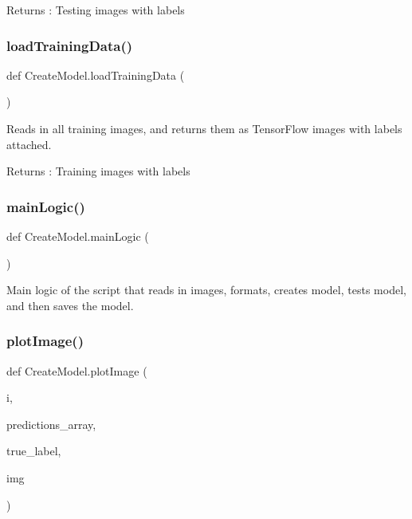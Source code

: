 \begin{DoxyReturn}{Returns}
\+: Testing images with labels 
\end{DoxyReturn}
\mbox{\label{namespaceCreateModel_a13d98b7ab2f39bdfb831e2f87a299c7e}} 
\subsubsection{\texorpdfstring{load\+Training\+Data()}{loadTrainingData()}}
{\footnotesize\ttfamily def Create\+Model.\+load\+Training\+Data (\begin{DoxyParamCaption}{ }\end{DoxyParamCaption})}



Reads in all training images, and returns them as Tensor\+Flow images with labels attached. 

\begin{DoxyReturn}{Returns}
\+: Training images with labels 
\end{DoxyReturn}
\mbox{\label{namespaceCreateModel_a34139424c0de1bb7aaf8f04b931ba11f}} 
\subsubsection{\texorpdfstring{main\+Logic()}{mainLogic()}}
{\footnotesize\ttfamily def Create\+Model.\+main\+Logic (\begin{DoxyParamCaption}{ }\end{DoxyParamCaption})}



Main logic of the script that reads in images, formats, creates model, tests model, and then saves the model. 

\mbox{\label{namespaceCreateModel_a596ac84e0b693e1daeb598454dc87f74}} 
\subsubsection{\texorpdfstring{plot\+Image()}{plotImage()}}
{\footnotesize\ttfamily def Create\+Model.\+plot\+Image (\begin{DoxyParamCaption}\item[{}]{i,  }\item[{}]{predictions\+\_\+array,  }\item[{}]{true\+\_\+label,  }\item[{}]{img }\end{DoxyParamCaption})}



